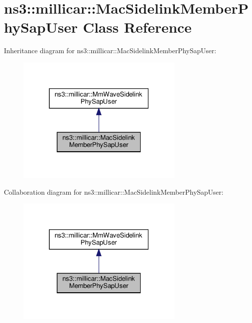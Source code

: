 \hypertarget{classns3_1_1millicar_1_1MacSidelinkMemberPhySapUser}{}\section{ns3\+:\+:millicar\+:\+:Mac\+Sidelink\+Member\+Phy\+Sap\+User Class Reference}
\label{classns3_1_1millicar_1_1MacSidelinkMemberPhySapUser}


Inheritance diagram for ns3\+:\+:millicar\+:\+:Mac\+Sidelink\+Member\+Phy\+Sap\+User\+:
\nopagebreak
\begin{figure}[H]
\begin{center}
\leavevmode
\includegraphics[width=232pt]{classns3_1_1millicar_1_1MacSidelinkMemberPhySapUser__inherit__graph}
\end{center}
\end{figure}


Collaboration diagram for ns3\+:\+:millicar\+:\+:Mac\+Sidelink\+Member\+Phy\+Sap\+User\+:
\nopagebreak
\begin{figure}[H]
\begin{center}
\leavevmode
\includegraphics[width=232pt]{classns3_1_1millicar_1_1MacSidelinkMemberPhySapUser__coll__graph}
\end{center}
\end{figure}
